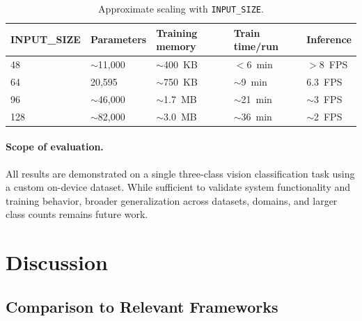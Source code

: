 \documentclass[12pt]{article}
\begin{document}
\begin{table}[H]
\centering
\caption{Approximate scaling with \texttt{INPUT\_SIZE}.}
\label{tab:scaling}
\begin{tabular}{lllll}
\toprule
\textbf{INPUT\_SIZE} & \textbf{Parameters} & \textbf{Training memory} & \textbf{Train time/run} & \textbf{Inference} \\
\midrule
48  & $\sim$11{,}000 & $\sim$400~KB & $<$6~min  & $>$8~FPS \\
64  & 20{,}595       & $\sim$750~KB & $\sim$9~min & 6.3~FPS \\
96  & $\sim$46{,}000 & $\sim$1.7~MB & $\sim$21~min & $\sim$3~FPS \\
128 & $\sim$82{,}000 & $\sim$3.0~MB & $\sim$36~min & $\sim$2~FPS \\
\bottomrule
\end{tabular}
\end{table}

\paragraph{Scope of evaluation.}
All results are demonstrated on a single three-class vision classification task
using a custom on-device dataset.
While sufficient to validate system functionality and training behavior, broader
generalization across datasets, domains, and larger class counts remains future
work.

\section{Discussion}
\label{sec:discussion2}

\subsection{Comparison to Relevant Frameworks}
\label{subsec:comparison}
\end{document}
